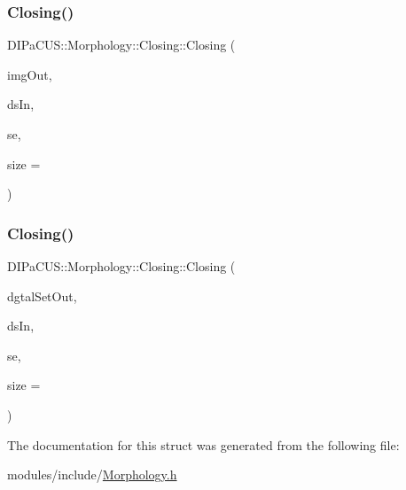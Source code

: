 \subsubsection{\texorpdfstring{Closing()}{Closing()}\hspace{0.1cm}{\footnotesize\ttfamily [1/2]}}
{\footnotesize\ttfamily D\+I\+Pa\+C\+U\+S\+::\+Morphology\+::\+Closing\+::\+Closing (\begin{DoxyParamCaption}\item[{\mbox{\hyperlink{namespaceDIPaCUS_1_1Morphology_a9aff9edf28d681accfc54435fbefcbee}{Image2D}} \&}]{img\+Out,  }\item[{const \mbox{\hyperlink{namespaceDIPaCUS_1_1Morphology_ab69fa725716b0ed4c311c0d00a292be7}{Digital\+Set}} \&}]{ds\+In,  }\item[{\mbox{\hyperlink{namespaceDIPaCUS_1_1Morphology_a60b552d68432e7992f09717070d9c4e7}{Structuring\+Element}}}]{se,  }\item[{int}]{size = {} }\end{DoxyParamCaption})\hspace{0.3cm}{\ttfamily [inline]}}

\mbox{\label{structDIPaCUS_1_1Morphology_1_1Closing_a21214c86a260cc3afe70193fd857402f}} 
\subsubsection{\texorpdfstring{Closing()}{Closing()}\hspace{0.1cm}{\footnotesize\ttfamily [2/2]}}
{\footnotesize\ttfamily D\+I\+Pa\+C\+U\+S\+::\+Morphology\+::\+Closing\+::\+Closing (\begin{DoxyParamCaption}\item[{\mbox{\hyperlink{namespaceDIPaCUS_1_1Morphology_ab69fa725716b0ed4c311c0d00a292be7}{Digital\+Set}} \&}]{dgtal\+Set\+Out,  }\item[{const \mbox{\hyperlink{namespaceDIPaCUS_1_1Morphology_ab69fa725716b0ed4c311c0d00a292be7}{Digital\+Set}} \&}]{ds\+In,  }\item[{\mbox{\hyperlink{namespaceDIPaCUS_1_1Morphology_a60b552d68432e7992f09717070d9c4e7}{Structuring\+Element}}}]{se,  }\item[{int}]{size = {} }\end{DoxyParamCaption})\hspace{0.3cm}{\ttfamily [inline]}}



The documentation for this struct was generated from the following file\+:\begin{DoxyCompactItemize}
\item 
modules/include/\mbox{\hyperlink{Morphology_8h}{Morphology.\+h}}\end{DoxyCompactItemize}
